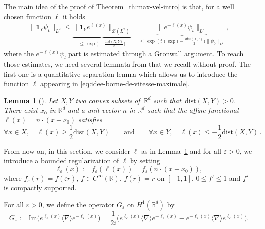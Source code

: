 \documentclass[12pt]{article}
\newcommand{\dXY}{{\mathrm{dist}(X,Y)}}
\theoremstyle{plain}
\newtheorem{lemma}[theo]{Lemma}
\newcommand{\Tepsilon}{{G_\varepsilon}}
\begin{document}
The main idea of the proof  of Theorem~\ref{th:max-vel-intro} is that, for a well chosen function $\ell$ it holds 
\begin{align}
\|\mathbf{1}_Y \psi_t\|_{L^2}
    \le \underset{\le\, \exp\big(-\frac{\dXY}{2}\big)}{\underbrace{\|\mathbf{1}_Ye^{\ell(x)}\|_{\mathcal{B}(L^2)}}} \quad
    \underset{\le\, \exp(t)\exp\big(-\frac{\dXY}{2}\big)\|\psi_0\|_{L^2}}{\underbrace{\|e^{-\ell(x)}\psi_t\|_{L^2}}}
   \,,\label{eq:idee-borne-de-vitesse-maximale}
\end{align}
where the $e^{-\ell(x)}\psi_t$ part is estimated through a Gronwall argument.
 To reach those estimates, we need several lemmata from \cite{BFG2a} that we recall without proof. The first one is a quantitative separation lemma which allows us to introduce the function $\ell$ appearing in \eqref{eq:idee-borne-de-vitesse-maximale}.
	\begin{lemma}[\cite{BFG2a}]\label{lm:convex}
		Let $X,Y$ two convex subsets of~$\mathbb{R}^d$ such that~$\dXY>0$. %
		There exist $x_0$ in $\mathbb{R}^d$ and a unit vector $n$  in $\mathbb{R}^d$ such that the affine functional~$\ell(x)=n\cdot (x-x_0)$ satisfies
		\begin{equation*}
		    \forall x\in X,\quad \ell(x)\ge\frac12 \dXY \qquad \text{and} \qquad \forall x\in Y,\quad \ell(x)\le-\frac12 \dXY\,.
		\end{equation*}
\end{lemma}
	
	From now on, in this section, we consider $\ell$ as in Lemma~\ref{lm:convex} and for all $\varepsilon>0$, we introduce a bounded regularization of $\ell$ by setting
	    \begin{equation*}
      \ell_\varepsilon(x):=f_\varepsilon(\ell(x))=f_\varepsilon(n\cdot(x-x_0)),
	    \end{equation*}
	    where $f_\varepsilon(r)=f(\varepsilon r)$, $f\in C^\infty(\mathbb{R})$, $f(r)=r$ on $[-1,1]$, $0\le f'\le1$ and $f'$ is compactly supported. 


	For all $\varepsilon>0$, we define the operator $\Tepsilon$ on $H^1(\mathbb{R}^d)$ by
	    \begin{equation}\label{eq:defTeps}
	        \Tepsilon:=\mathrm{Im}\big(e^{\ell_\varepsilon(x)} \langle\nabla\rangle e^{-\ell_\varepsilon(x)}\big)=\frac{1}{2i}\big(e^{\ell_\varepsilon(x)} \langle\nabla\rangle e^{-\ell_\varepsilon(x)}-e^{-\ell_\varepsilon(x)} \langle\nabla\rangle e^{\ell_\varepsilon(x)}\big).
	    \end{equation}
	    
\end{document}

